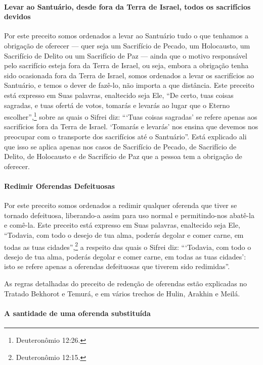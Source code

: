 \paragraph{Levar ao Santuário, desde fora da Terra de Israel, todos os sacrifícios devidos}

Por este preceito somos ordenados a levar ao Santuário tudo o que
tenhamos a obrigação de oferecer --- quer seja um Sacrifício de Pecado,
um Holocausto, um Sacrifício de Delito ou um Sacrifício de Paz --- ainda
que o motivo responsável pelo sacrifício esteja fora da Terra de
Israel, ou seja, embora a obrigação tenha sido ocasionada fora da Terra
de Israel, somos ordenados a levar os sacrifícios ao Santuário, e temos
o dever de fazê-lo, não importa a que distância. Este preceito está
expresso em Suas palavras, enaltecido seja Ele, ``De certo, tuas coisas
sagradas, e tuas ofertá de votos, tomarás e levarás ao lugar que o
Eterno escolher'',\footnote{Deuteronômio 12:26.} sobre as quais o Sifrei diz:
```Tuas coisas sagradas' se refere apenas aos sacrifícios fora da Terra
de Israel. `Tomarás e levarás' nos ensina que devemos nos preocupar com
o transporte dos sacrifícios até o Santuário''. Está explicado ali que
isso se aplica apenas nos casos de Sacrifício de Pecado, de Sacrifício
de Delito, de Holocausto e de Sacrifício de Paz que a pessoa tem a
obrigação de oferecer.

\paragraph{Redimir Oferendas Defeituosas}

Por este preceito somos ordenados a redimir qualquer oferenda que tiver
se tornado defeituosa, liberando-a assim para uso normal e
permitindo-nos abatê-la e comê-la. Este preceito está expresso em Suas
palavras, enaltecido seja Ele, ``Todavia, com todo o desejo de tua alma,
poderás degolar e comer carne, em todas as tuas cidades'',\footnote{Deuteronômio
12:15.} a respeito das quais o Sifrei diz: ```Todavia, com todo o desejo
de tua alma, poderás degolar e comer carne, em todas as tuas cidades':
isto se refere apenas a oferendas defeituosas que tiverem sido
redimidas''.

As regras detalhadas do preceito de redenção de oferendas estão
explicadas no Tratado Bekhorot e Temurá, e em vários trechos de Hulin,
Arakhin e Meilá.

\paragraph{A santidade de uma oferenda substituída}

